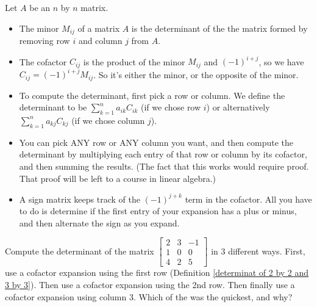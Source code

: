 \begin{definition}\label{general determinants}
Let {$A$} be an $n$ by $n$ matrix. 
\begin{itemize}
 \item The minor {$M_{ij}$} of a matrix {$A$} is the determinant of the the matrix formed by removing row {$i$} and column {$j$} from {$A$}. 
 \item The cofactor $C_{ij}$ is the product of the minor $M_{ij}$ and $(-1)^{i+j}$, so we have $C_{ij} = (-1)^{i+j}M_{ij}$. So it's either the minor, or the opposite of the minor. 
 \item To compute the determinant, first pick a row or column.
We define the determinant to be $\sum_{k=1}^n a_{ik}C_{ik}$ (if we chose row $i$) or alternatively $\sum_{k=1}^n a_{kj}C_{kj}$ (if we chose column $j$).  
\item You can pick ANY row or ANY column you want, and then compute the determinant by multiplying each entry of that row or column by its cofactor, and then summing the results.  (The fact that this works would require proof.  That proof will be left to a course in linear algebra.)
\item 
{}%
A sign matrix keeps track of the $(-1)^{j+k}$ term in the cofactor. All you have to do is determine if the first entry of your expansion has a plus or minus, and then alternate the sign as you expand.

\end{itemize}

\end{definition}





\begin{problem}
 Compute the determinant of the matrix
$
\begin{bmatrix}
 2 & 3 & -1 \\
 1 & 0 & 0 \\
 4 & 2 & 5
\end{bmatrix}
$
in 3 different ways. First, use a cofactor expansion using the first row (Definition \ref{determinat of 2 by 2 and 3 by 3}).  Then use a cofactor expansion using the 2nd row.  Then finally use a cofactor expansion using column 3.  Which of the was the quickest, and why?
\end{problem}

